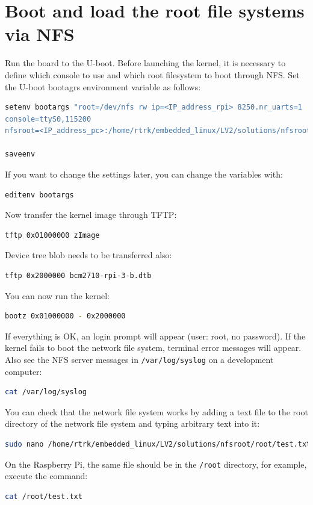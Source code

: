 \documentclass[11pt]{article}
\begin{document}
\section{Boot and load the root file systems via NFS}
Run the board to the U-boot. Before launching the kernel, it is necessary to
 define which console to use and which root filesystem to boot through NFS. Set
 the U-boot bootagrs environment variable as follows:
\begin{lstlisting}[language=bash]
setenv bootargs "root=/dev/nfs rw ip=<IP_address_rpi> 8250.nr_uarts=1
console=ttyS0,115200
nfsroot=<IP_address_pc>:/home/rtrk/embedded_linux/LV2/solutions/nfsroot"

saveenv
\end{lstlisting}
If you want to change the settings later, you can change the variables with:
\begin{lstlisting}[language=bash]
editenv bootargs
\end{lstlisting}
Now transfer the kernel image through TFTP:
\begin{lstlisting}[language=bash]
tftp 0x01000000 zImage
\end{lstlisting}
Device tree blob needs to be transferred also:
\begin{lstlisting}[language=bash]
tftp 0x2000000 bcm2710-rpi-3-b.dtb
\end{lstlisting}
You can now run the kernel:
\begin{lstlisting}[language=bash]
bootz 0x01000000 - 0x2000000
\end{lstlisting}
If everything is OK, an login prompt will appear (user: root, no password).
If the kernel fails to boot the network file system, terminal error messages
 will appear. Also see the NFS server messages in \texttt{/var/log/syslog} on a
 development computer:
\begin{lstlisting}[language=bash]
cat /var/log/syslog
\end{lstlisting}
You can check that the network file system works by adding a text file to the
 root directory of the network file system and typing arbitrary text into it:
\begin{lstlisting}[language=bash]
sudo nano /home/rtrk/embedded_linux/LV2/solutions/nfsroot/root/test.txt
\end{lstlisting}
On the Raspberry Pi, the same file should be in the \texttt{/root} directory,
 for example, execute the command:
\begin{lstlisting}[language=bash]
cat /root/test.txt
\end{lstlisting}
\end{document}
